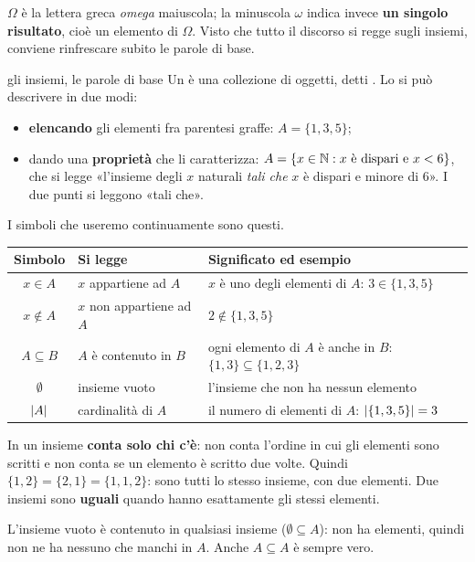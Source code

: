 $\Omega$ è la lettera greca \emph{omega} maiuscola; la minuscola $\omega$ indica invece \textbf{un singolo risultato},
cioè un elemento di $\Omega$. Visto che tutto il discorso si regge sugli insiemi, conviene rinfrescare subito le
parole di base.

\begin{richiamo}{gli insiemi, le parole di base}
Un  è una collezione di oggetti, detti . Lo si può descrivere in due modi:
\begin{itemize}
  \item \textbf{elencando} gli elementi fra parentesi graffe: $A = \{1, 3, 5\}$;
  \item dando una \textbf{proprietà} che li caratterizza: $A = \{x \in \mathbb{N} : x \text{ è dispari e } x < 6\}$, che si legge
        «l'insieme degli $x$ naturali \emph{tali che} $x$ è dispari e minore di 6». I due punti si leggono «tali che».
\end{itemize}
I simboli che useremo continuamente sono questi.
\begin{center}
\renewcommand{\arraystretch}{1.25}
\begin{tabular}{@{}clP{6.6cm}@{}}
  \toprule
  \textbf{Simbolo} & \textbf{Si legge} & \textbf{Significato ed esempio} \\
  \midrule
  $x \in A$ & $x$ appartiene ad $A$ & $x$ è uno degli elementi di $A$: $3 \in \{1,3,5\}$ \\
  $x \notin A$ & $x$ non appartiene ad $A$ & $2 \notin \{1,3,5\}$ \\
  $A \subseteq B$ & $A$ è contenuto in $B$ & ogni elemento di $A$ è anche in $B$: $\{1,3\} \subseteq \{1,2,3\}$ \\
  $\emptyset$ & insieme vuoto & l'insieme che non ha nessun elemento \\
  $\left\lvert A \right\rvert$ & cardinalità di $A$ & il numero di elementi di $A$: $\left\lvert \{1,3,5\} \right\rvert = 3$ \\
  \bottomrule
\end{tabular}
\end{center}
In un insieme \textbf{conta solo chi c'è}: non conta l'ordine in cui gli elementi sono scritti e non conta se un
elemento è scritto due volte. Quindi $\{1,2\} = \{2,1\} = \{1,1,2\}$: sono tutti lo stesso insieme, con due elementi.
Due insiemi sono \textbf{uguali} quando hanno esattamente gli stessi elementi.

L'insieme vuoto è contenuto in qualsiasi insieme ($\emptyset \subseteq A$): non ha elementi, quindi non ne ha nessuno
che manchi in $A$. Anche $A \subseteq A$ è sempre vero.
\end{richiamo}

